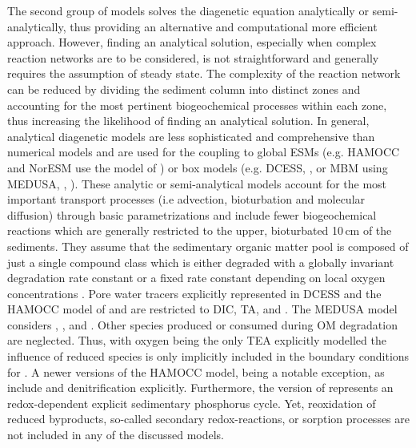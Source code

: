 \documentclass[gmd, manuscript]{copernicus}
\begin{document}
The second group of models solves the diagenetic equation analytically or semi-analytically, thus providing an alternative and computational more efficient approach. 
However, finding an analytical solution, especially when complex reaction networks are to be considered, is not straightforward and generally requires the assumption of steady state. 
The complexity of the reaction network can be reduced by dividing the sediment column into distinct zones and accounting for the most pertinent biogeochemical processes 
within each zone, thus increasing the likelihood of finding an analytical solution. %
In general, analytical diagenetic models are less sophisticated and comprehensive than numerical models and are used for the coupling 
to global ESMs (e.g. HAMOCC and NorESM use the model of \citet{heinze_global_1999}) or box models (e.g. DCESS, \citeauthor{shaffer_presentation_2008}, \citeyear{shaffer_presentation_2008} or 
MBM using MEDUSA, \citeauthor{munhoven_glacialinterglacial_2007}, \citeyear{munhoven_glacialinterglacial_2007}). 
These analytic or semi-analytical models  account for the most important transport processes (i.e advection, bioturbation and molecular diffusion) through basic parametrizations and 
include fewer biogeochemical reactions which are generally restricted to the upper, bioturbated 10\,cm of the sediments. 
They assume that the sedimentary organic matter pool is composed of just a single compound class which is either degraded with a globally invariant degradation rate constant 
\citep[][]{munhoven_glacialinterglacial_2007} or a fixed rate constant depending on local oxygen concentrations \citep{shaffer_presentation_2008, palastanga_long_term_2011}. 
Pore water tracers explicitly represented in DCESS \citep{shaffer_presentation_2008} and the HAMOCC model of \citet{heinze_global_1999} and \citet{palastanga_long_term_2011} 
are restricted to DIC, TA,  and . The MEDUSA model \citep{munhoven_glacialinterglacial_2007} considers , ,  and . 
Other species produced or consumed during OM degradation are neglected. 
Thus, with oxygen being the only TEA explicitly modelled the influence of reduced species is only implicitly included in the boundary conditions for . 
A newer versions of the HAMOCC model, being a notable exception, as \citet{ilyina_global_2013} include  and denitrification explicitly. Furthermore, the version of 
\citet{palastanga_long_term_2011} represents an redox-dependent explicit sedimentary phosphorus cycle. 
Yet, reoxidation of reduced byproducts, so-called secondary redox-reactions, or sorption processes are not included in any of the discussed models. 
\end{document}
